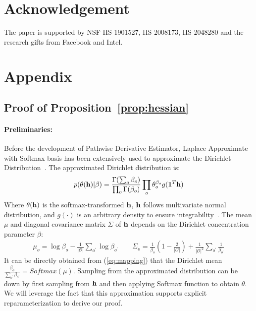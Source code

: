 \documentclass{article} \usepackage{iclr2021_conference,times}
\begin{document}
\section*{Acknowledgement} 
The paper is supported by NSF IIS-1901527, IIS 2008173, IIS-2048280 and the research gifts from Facebook and Intel. 










\clearpage

\appendix
\section{Appendix}

\subsection{Proof of Proposition~\ref{prop:hessian}}
\label{app:hessian}

\paragraph{Preliminaries:}
Before the development of Pathwise Derivative Estimator, Laplace Approximate with Softmax basis has been extensively used to approximate the Dirichlet Distribution~\citep{laplace, topic}.
The approximated Dirichlet distribution is:
\begin{align}
    p(\theta(\bold{h})|\beta) = \frac{\Gamma(\sum_o \beta_o)}{\prod_o \Gamma(\beta_o)} \prod_o \theta_o^{\beta_o} g(\bold{1}^T\bold{h})
\end{align}
Where $\theta(\bold{h})$ is the softmax-transformed $\bold{h}$, $\bold{h}$ follows multivariate normal distribution, and $g(\cdot)$ is an arbitrary density to ensure integrability~\citep{topic}.
The mean $\mu$ and diagonal covariance matrix $\Sigma$ of $\bold{h}$ depends on the Dirichlet concentration parameter $\beta$:
\begin{align}
    \label{eq:mapping}
    \mu_o = \log{\beta_o} - \frac{1}{|\mathcal{O}|} \sum_{o^{'}} \log{\beta_{o^{'}}} \quad\quad \Sigma_o = \frac{1}{\beta_o}(1 - \frac{2}{|\mathcal{O}|}) + \frac{1}{|\mathcal{O}|^2}\sum_{o^{'}} \frac{1}{\beta_{o^{'}}}
\end{align}
It can be directly obtained from (\ref{eq:mapping}) that the Dirichlet mean $\frac{\beta_o}{\sum_{o^{'}}\beta_{o^{'}}} = Softmax(\mu)$.
Sampling from the approximated distribution can be down by first sampling from $\bold{h}$ and then applying Softmax function to obtain $\theta$.
We will leverage the fact that this approximation supports explicit reparameterization to derive our proof.
\end{document}
